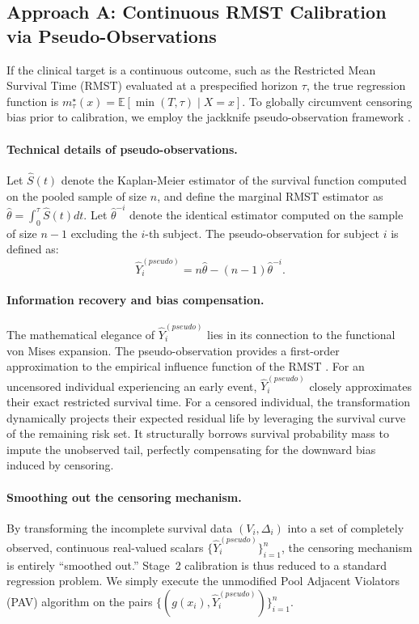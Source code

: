 \documentclass[11pt]{article}
\theoremstyle{plain}
\theoremstyle{plain}
\theoremstyle{plain}
\theoremstyle{plain}
\theoremstyle{plain}
\theoremstyle{plain}
\theoremstyle{plain}
\begin{document}
\subsection{Approach A: Continuous RMST Calibration via Pseudo-Observations}

If the clinical target is a continuous outcome, such as the Restricted Mean Survival Time (RMST) evaluated at a prespecified horizon $\tau$, the true regression function is $m^{\star}_{\tau}(x) = \mathbb{E}[\min(T, \tau) \mid X=x]$. To globally circumvent censoring bias prior to calibration, we employ the jackknife pseudo-observation framework \citep{andersen2010pseudo}.

\paragraph{Technical details of pseudo-observations.} 
Let $\hat{S}(t)$ denote the Kaplan-Meier estimator of the survival function computed on the pooled sample of size $n$, and define the marginal RMST estimator as $\hat{\theta} = \int_0^\tau \hat{S}(t) dt$. Let $\hat{\theta}^{-i}$ denote the identical estimator computed on the sample of size $n-1$ excluding the $i$-th subject. The pseudo-observation for subject $i$ is defined as:
\begin{equation}
\label{eq:pseudo_obs}
    \hat{Y}_i^{(pseudo)} = n\hat{\theta} - (n-1)\hat{\theta}^{-i}.
\end{equation}

\paragraph{Information recovery and bias compensation.} 
The mathematical elegance of $\hat{Y}_i^{(pseudo)}$ lies in its connection to the functional von Mises expansion. The pseudo-observation provides a first-order approximation to the empirical influence function of the RMST \citep{graw2009pseudo}. For an uncensored individual experiencing an early event, $\hat{Y}_i^{(pseudo)}$ closely approximates their exact restricted survival time. For a censored individual, the transformation dynamically projects their expected residual life by leveraging the survival curve of the remaining risk set. It structurally borrows survival probability mass to impute the unobserved tail, perfectly compensating for the downward bias induced by censoring.

\paragraph{Smoothing out the censoring mechanism.} 
By transforming the incomplete survival data $(V_i, \Delta_i)$ into a set of completely observed, continuous real-valued scalars $\{\hat{Y}_i^{(pseudo)}\}_{i=1}^n$, the censoring mechanism is entirely ``smoothed out.'' Stage~2 calibration is thus reduced to a standard regression problem. We simply execute the unmodified Pool Adjacent Violators (PAV) algorithm on the pairs $\{(g(x_i), \hat{Y}_i^{(pseudo)})\}_{i=1}^n$.
\end{document}
